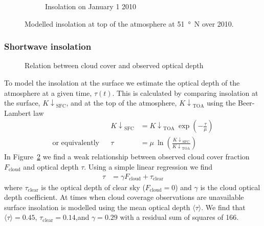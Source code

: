 \documentclass[a4paper,titlepage]{article}
\newcommand\Kdownsfc{{K\!\!\downarrow}_\mathrm{SFC}}
\newcommand\Kdowntoa{{K\!\!\downarrow}_\mathrm{TOA}}
\begin{document}
\begin{figure}
\centering
\begin{subfigure}{0.45\textwidth}

\end{subfigure}
\hfill
\begin{subfigure}{0.45\textwidth}

\caption{Insolation on January 1 2010}
\end{subfigure}
\caption{Modelled insolation at top of the atmosphere at \SI{51}{\degree N} over 2010.}
\label{fig:toa-model}
\end{figure}

\subsubsection{Shortwave insolation}
\begin{figure}
\centering

\caption{Relation between cloud cover and observed optical depth}
\label{fig:cloud-tau-fit}
\end{figure}

To model the insolation at the surface we estimate the optical depth of the atmosphere at a given time, $\tau(t)$.  This is calculated by comparing insolation at the surface, $\Kdownsfc$, and at the top of the atmosphere, $\Kdowntoa$ using the Beer-Lambert law
\begin{align}
&& \Kdownsfc &= \Kdowntoa\: \exp \left( -\frac{\tau}{\mu} \right) \\
\text{or equivalently} && \tau &= \mu \: \ln \left( \frac{\Kdownsfc}{\Kdowntoa} \right)
\end{align}
In Figure~\ref{fig:cloud-tau-fit} we find a weak relationship between observed cloud cover fraction $F_\mathrm{cloud}$ and optical depth $\tau$.  Using a simple linear regression we find
\begin{align}
\tau &= \gamma F_\mathrm{cloud} + \tau_\mathrm{clear}
\end{align}
where $\tau_\mathrm{clear}$ is the optical depth of clear sky ($F_\mathrm{cloud} = 0$) and $\gamma$ is the cloud optical depth coefficient.  At times when cloud coverage observations are unavailable surface insolation is modelled using the mean optical depth $\langle \tau \rangle$.  We find that $\langle \tau \rangle = 0.45$, $\tau_\mathrm{clear} = 0.14$,and $\gamma =  0.29$ with a residual sum of squares of 166.
\end{document}
